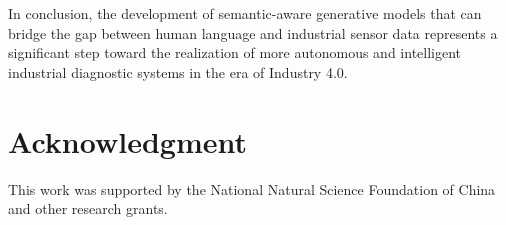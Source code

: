 \documentclass[journal,12pt,onecolumn]{IEEEtran}
\begin{document}
In conclusion, the development of semantic-aware generative models that can bridge the gap between human language and industrial sensor data represents a significant step toward the realization of more autonomous and intelligent industrial diagnostic systems in the era of Industry 4.0.

\section*{Acknowledgment}

This work was supported by the National Natural Science Foundation of China and other research grants.




\end{document}
